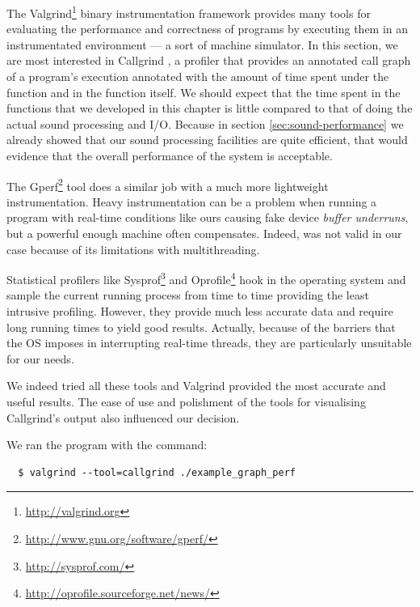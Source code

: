 The Valgrind\footnote{\url{http://valgrind.org}}
\cite{nethercote07valgrind} binary instrumentation framework provides
many tools for evaluating the performance and correctness of programs
by executing them in an instrumentated environment --- a sort of
machine simulator. In this section, we are most interested in
Callgrind \cite{weidendorfer04callgrind}, a profiler that provides an
annotated call graph of a program's execution annotated with the
amount of time spent under the function and in the function itself. We
should expect that the time spent in the functions that we developed
in this chapter is little compared to that of doing the actual sound
processing and I/O. Because in section \ref{sec:sound-performance} we
already showed that our sound processing facilities are quite
efficient, that would evidence that the overall performance of the
system is acceptable.

\begin{mynote}
  The Gperf\footnote{\url{http://www.gnu.org/software/gperf/}} tool
  does a similar job with a much more lightweight
  instrumentation. Heavy instrumentation can be a problem when running
  a program with real-time conditions like ours causing fake device
  \emph{buffer underruns}, but a powerful enough machine often
  compensates. Indeed,  was not valid in our case because
  of its limitations with multithreading. 

  Statistical profilers like
  Sysprof\footnote{\url{http://sysprof.com/}} and
  Oprofile\footnote{\url{http://oprofile.sourceforge.net/news/}} hook
  in the operating system and sample the current running process from
  time to time providing the least intrusive profiling. However, they
  provide much less accurate data and require long running times to
  yield good results. Actually, because of the barriers that the OS
  imposes in interrupting real-time threads, they are particularly
  unsuitable for our needs.

  We indeed tried all these tools and Valgrind provided the most
  accurate and useful results. The ease of use and polishment of the
  tools for visualising Callgrind's output also influenced our
  decision.
\end{mynote}

We ran the program with the command:
\begin{verbatim}
  $ valgrind --tool=callgrind ./example_graph_perf
\end{verbatim}

